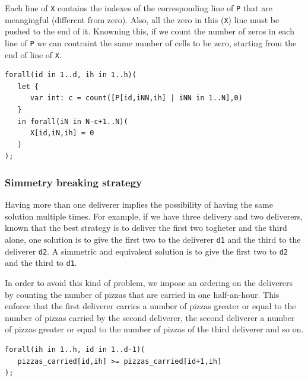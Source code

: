 \documentclass[10pt]{article}
\begin{document}
\begin{enumerate}
		Each line of \texttt{X} contains the indexes of the corresponding line of \texttt{P}
		that are meangingful (different from zero). Also, all the zero in this (\texttt{X}) 
		line must be pushed to the end of it. Knowning this, if we count the number of zeros
		in each line of \texttt{P} we can contraint the same number of cells to be zero, starting
		from the end of line of \texttt{X}.

		\begin{verbatim}
forall(id in 1..d, ih in 1..h)(
   let {
      var int: c = count([P[id,iNN,ih] | iNN in 1..N],0)
   }
   in forall(iN in N-c+1..N)(
      X[id,iN,ih] = 0
   )  
);
		\end{verbatim}
		

	\end{enumerate}

	\subsubsection{Simmetry breaking strategy}
	Having more than one deliverer implies the possibility of having the same solution 
	multiple times. For example, if we have three delivery and two deliverers, known that
	the best strategy is to deliver the first two togheter and the third alone, one solution is 
	to give the first two to the deliverer \texttt{d1} and the third to the deliverer \texttt{d2}.
	A simmetric and equivalent solution is to give the first two to \texttt{d2} and 
	the third to \texttt{d1}.

	In order to avoid this kind of problem, we impose an ordering on the deliverers by 
	counting the number of pizzas that are carried in one half-an-hour. This enforce that 
	the first deliverer carries a number of pizzas greater or equal to the number of
	pizzas carried by the second deliverer, the second deliverer a number of pizzas greater or 
	equal to the number of pizzas of the third deliverer and so on.
\begin{verbatim}
forall(ih in 1..h, id in 1..d-1)(
   pizzas_carried[id,ih] >= pizzas_carried[id+1,ih]
);
\end{verbatim}

%
%
\end{document}
